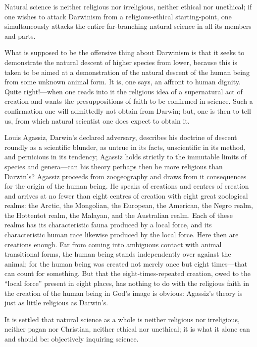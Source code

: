 \documentclass[12pt,a4paper]{article}
\begin{document}
Natural science is neither religious nor irreligious, neither ethical
nor unethical; if one wishes to attack Darwinism from a
religious-ethical starting-point, one simultaneously attacks the
entire far-branching natural science in all its members and parts.

What is supposed to be the offensive thing about Darwinism is that it
seeks to demonstrate the natural descent of higher species from lower,
because this is taken to be aimed at a demonstration of the natural
descent of the human being from some unknown animal form. It is, one
says, an affront to human dignity. Quite right!---when one reads into
it the religious idea of a supernatural act of creation and wants the
presuppositions of faith to be confirmed in science. Such a
confirmation one will admittedly not obtain from Darwin; but, one is
then to tell us, from which natural scientist one does expect to
obtain it.

Louis Agassiz, Darwin's declared adversary, describes his doctrine of
descent roundly as a scientific blunder, as untrue in its facts,
unscientific in its method, and pernicious in its tendency; Agassiz
holds strictly to the immutable limits of species and genera---can his
theory perhaps then be more religious than Darwin's? Agassiz proceeds
from zoogeography and draws from it consequences for the origin of the
human being. He speaks of creations and centres of creation and arrives
at no fewer than eight centres of creation with eight great zoological
realms: the Arctic, the Mongolian, the European, the American, the
Negro realm, the Hottentot realm, the Malayan, and the Australian
realm. Each of these realms has its characteristic fauna produced by a
local force, and its characteristic human race likewise produced by
the local force. Here then are creations enough. Far from coming into
ambiguous contact with animal transitional forms, the human being
stands independently over against the animal; for the human being was
created not merely once but eight times---that can count for something.
But that the eight-times-repeated creation, owed to the ``local
force'' present in eight places, has nothing to do with the religious
faith in the creation of the human being in God's image is obvious:
Agassiz's theory is just as little religious as Darwin's.

It is settled that natural science as a whole is neither religious nor
irreligious, neither pagan nor Christian, neither ethical nor
unethical; it is what it alone can and should be: objectively
inquiring science.
\end{document}
